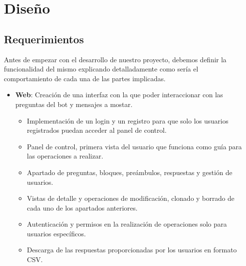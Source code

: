 \chapter{Diseño}

\section{Requerimientos}
Antes de empezar con el desarrollo de nuestro proyecto, debemos definir la funcionalidad del mismo explicando detalladamente como sería el comportamiento de cada una de las partes implicadas.

\begin{itemize}
\item \textbf{Web}: Creación de una interfaz con la que poder interaccionar con las preguntas del bot y mensajes a mostar.
\begin{itemize}
\item Implementación de un login y un registro para que solo los usuarios registrados puedan acceder al panel de control.
\item Panel de control, primera vista del usuario que funciona como guía para las operaciones a realizar.
\item Apartado de preguntas, bloques, preámbulos, respuestas y gestión de usuarios.
\item Vistas de detalle y operaciones de modificación, clonado y borrado de cada uno de los apartados anteriores.
\item Autenticación y permisos en la realización de operaciones solo para usuarios específicos.
\item Descarga de las respuestas proporcionadas por los usuarios en formato CSV.

\end{itemize}


\end{itemize}
